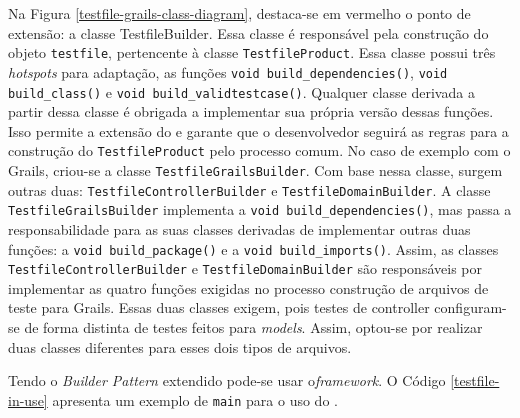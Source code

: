 Na Figura \ref{testfile-grails-class-diagram}, destaca-se em vermelho
o ponto de extensão: a classe \textsf{TestfileBuilder}. Essa classe é responsável
pela construção do objeto \lstinline|testfile|, pertencente à classe
\lstinline|TestfileProduct|. Essa classe possui três \textit{hotspots} para adaptação, as funções
\lstinline|void build_dependencies()|, \lstinline|void build_class()| e
\lstinline|void build_validtestcase()|. Qualquer classe derivada a partir dessa classe é
obrigada a implementar sua própria versão dessas funções. Isso permite a extensão
do \framework e garante que o desenvolvedor seguirá as regras para a construção do
\lstinline|TestfileProduct| pelo processo comum. No caso de exemplo com o
\textsf{Grails}, criou-se a classe \lstinline|TestfileGrailsBuilder|. Com base
nessa classe, surgem outras duas: \lstinline|TestfileControllerBuilder| e
\lstinline|TestfileDomainBuilder|. A classe \lstinline|TestfileGrailsBuilder|
implementa a \lstinline|void build_dependencies()|, mas passa a responsabilidade
para as suas classes derivadas de implementar outras duas funções: a
\lstinline|void build_package()| e a \lstinline|void build_imports()|. Assim,
as classes \lstinline|TestfileControllerBuilder| e \lstinline|TestfileDomainBuilder|
são responsáveis por implementar as quatro funções exigidas no processo
construção de arquivos de teste para \textsf{Grails}. Essas duas classes exigem, pois testes de controller configuram-se de forma
distinta de testes feitos para \textit{models}. Assim, optou-se por realizar duas classes
diferentes para esses dois tipos de arquivos.

Tendo o \textit{Builder Pattern} extendido pode-se usar o\textit{framework}.
O Código \ref{testfile-in-use} apresenta um exemplo de \lstinline|main| para
o uso do \Scarefault.

